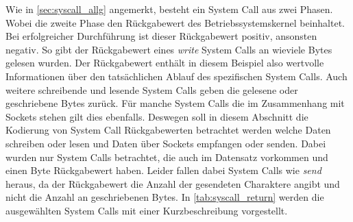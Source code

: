                 Wie in \autoref{sec:syscall_allg} angemerkt, besteht ein System Call aus zwei \glqq Phasen\grqq.
                Wobei die zweite Phase den Rückgabewert des Betriebssystemskernel beinhaltet.
                Bei erfolgreicher Durchführung ist dieser Rückgabewert positiv, ansonsten negativ.
                So gibt der Rückgabewert eines \textit{write} System Calls an wieviele Bytes gelesen wurden.
                Der Rückgabewert enthält in diesem Beispiel also wertvolle Informationen über den tatsächlichen Ablauf des spezifischen System Calls.
                Auch weitere schreibende und lesende System Calls geben die gelesene oder geschriebene Bytes zurück.
                Für manche System Calls die im Zusammenhang mit Sockets stehen gilt dies ebenfalls.
                Deswegen soll in diesem Abschnitt die Kodierung von System Call Rückgabewerten betrachtet werden welche Daten schreiben oder lesen und Daten über Sockets empfangen oder senden. 
                Dabei wurden nur System Calls betrachtet, die auch im Datensatz vorkommen und einen Byte Rückgabewert haben.
                Leider fallen dabei System Calls wie \textit{send} heraus, da der Rückgabewert die Anzahl der gesendeten Charaktere angibt und nicht die Anzahl an geschriebenen Bytes.
                In \autoref{tab:syscall_return} werden die ausgewählten System Calls mit einer Kurzbeschreibung vorgestellt.


